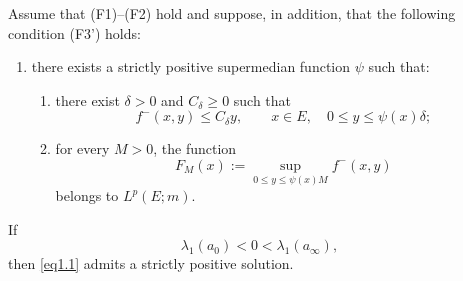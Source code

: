 \documentclass[10pt,a4paper]{amsart}
\begin{document}
\begin{corollary}
\label{cor.weakerF3}
Assume that \textup{(F1)--(F2)} hold and suppose, in addition, that the following  condition \textup{(F3')} holds:
\begin{enumerate}
\item[{\rm (F3')}] there exists a strictly positive supermedian function $\psi$ such that:
\begin{enumerate}
\item[(i)] there exist $\delta>0$ and $C_\delta\ge0$ such that
\[
f^-(x,y)\le C_\delta y,
\qquad x\in E,\quad 0\le y\le \psi(x)\delta;
\]
\item[(ii)] for every $M>0$, the function 
\[
F_M(x):=\sup_{0\le y\le \psi(x) M}f^-(x,y)
\]
belongs to $L^p(E;m)$.
\end{enumerate} 
\end{enumerate}
If
\begin{equation}
\label{eq.weakerF3.spectral}
\lambda_1(a_0)<0<\lambda_1(a_\infty),
\end{equation}
then \eqref{eq1.1} admits a strictly positive solution.
\end{corollary}
\end{document}
